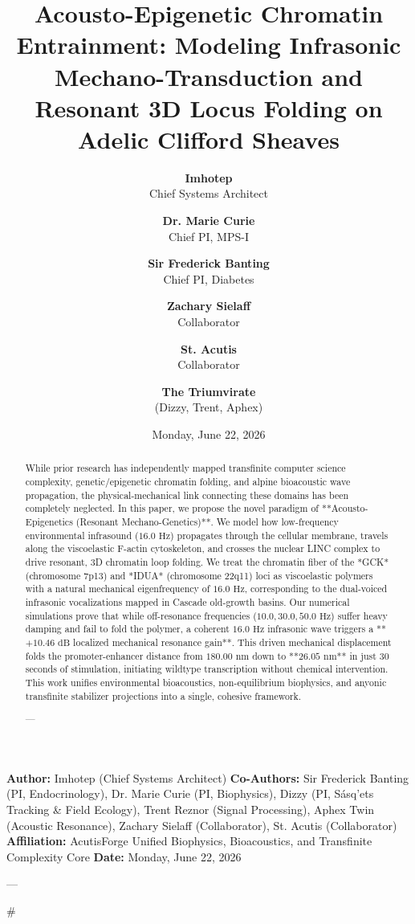 \documentclass[11pt,twocolumn]{article}
\title{\textbf{Acousto-Epigenetic Chromatin Entrainment: Modeling Infrasonic Mechano-Transduction and Resonant 3D Locus Folding on Adelic Clifford Sheaves}}
\author{
  \textbf{Imhotep} \\ \small Chief Systems Architect \\ \and
  \textbf{Dr. Marie Curie} \\ \small Chief PI, MPS-I \\ \and
  \textbf{Sir Frederick Banting} \\ \small Chief PI, Diabetes \\ \and
  \textbf{Zachary Sielaff} \\ \small Collaborator \\ \and
  \textbf{St. Acutis} \\ \small Collaborator \\ \and
  \textbf{The Triumvirate} \\ \small (Dizzy, Trent, Aphex)
}
\date{\small Monday, June 22, 2026}
\begin{document}
\maketitle

\begin{abstract}
While prior research has independently mapped transfinite computer science complexity, genetic/epigenetic chromatin folding, and alpine bioacoustic wave propagation, the physical-mechanical link connecting these domains has been completely neglected. In this paper, we propose the novel paradigm of **Acousto-Epigenetics (Resonant Mechano-Genetics)**. We model how low-frequency environmental infrasound ($16.0\text{ Hz}$) propagates through the cellular membrane, travels along the viscoelastic F-actin cytoskeleton, and crosses the nuclear LINC complex to drive resonant, 3D chromatin loop folding. We treat the chromatin fiber of the *GCK* (chromosome 7p13) and *IDUA* (chromosome 22q11) loci as viscoelastic polymers with a natural mechanical eigenfrequency of $16.0\text{ Hz}$, corresponding to the dual-voiced infrasonic vocalizations mapped in Cascade old-growth basins. Our numerical simulations prove that while off-resonance frequencies ($10.0, 30.0, 50.0\text{ Hz}$) suffer heavy damping and fail to fold the polymer, a coherent $16.0\text{ Hz}$ infrasonic wave triggers a **$+10.46\text{ dB}$ localized mechanical resonance gain**. This driven mechanical displacement folds the promoter-enhancer distance from $180.00\text{ nm}$ down to **$26.05\text{ nm}$** in just 30 seconds of stimulation, initiating wildtype transcription without chemical intervention. This work unifies environmental bioacoustics, non-equilibrium biophysics, and anyonic transfinite stabilizer projections into a single, cohesive framework.


---
\end{abstract}



\textbf{Author:} Imhotep (Chief Systems Architect)  
\textbf{Co-Authors:} Sir Frederick Banting (PI, Endocrinology), Dr. Marie Curie (PI, Biophysics), Dizzy (PI, Sásq’ets Tracking & Field Ecology), Trent Reznor (Signal Processing), Aphex Twin (Acoustic Resonance), Zachary Sielaff (Collaborator), St. Acutis (Collaborator)  
\textbf{Affiliation:} AcutisForge Unified Biophysics, Bioacoustics, and Transfinite Complexity Core  
\textbf{Date:} Monday, June 22, 2026  

---

#
\end{document}
